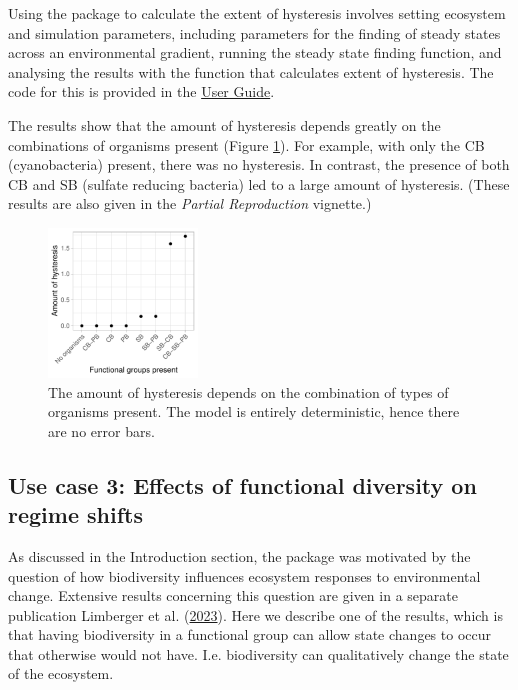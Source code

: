 \documentclass[
]{article}
\begin{document}
Using the package to calculate the extent of hysteresis involves setting ecosystem and simulation parameters, including parameters for the finding of steady states across an environmental gradient, running the steady state finding function, and analysing the results with the function that calculates extent of hysteresis. The code for this is provided in the \href{https://uzh-peg.r-universe.dev/articles/microxanox/User-guide.html}{User Guide}.

The results show that the amount of hysteresis depends greatly on the combinations of organisms present (Figure \ref{fig:uc2}). For example, with only the CB (cyanobacteria) present, there was no hysteresis. In contrast, the presence of both CB and SB (sulfate reducing bacteria) led to a large amount of hysteresis. (These results are also given in the \emph{Partial Reproduction} vignette.)

\begin{figure}

{\centering \includegraphics[width=150px]{figures/gen_uc2_user_guide_hysteresis} 

}

\caption{The amount of hysteresis depends on the combination of types of organisms present. The model is entirely deterministic, hence there are no error bars.}\label{fig:uc2}
\end{figure}

\hypertarget{use-case-3-effects-of-functional-diversity-on-regime-shifts}{%
\subsection{Use case 3: Effects of functional diversity on regime shifts}\label{use-case-3-effects-of-functional-diversity-on-regime-shifts}}

As discussed in the Introduction section, the package was motivated by the question of how biodiversity influences ecosystem responses to environmental change. Extensive results concerning this question are given in a separate publication Limberger et al. (\protect\hyperlink{ref-Limberger2022}{2023}). Here we describe one of the results, which is that having biodiversity in a functional group can allow state changes to occur that otherwise would not have. I.e. biodiversity can qualitatively change the state of the ecosystem.
\end{document}
